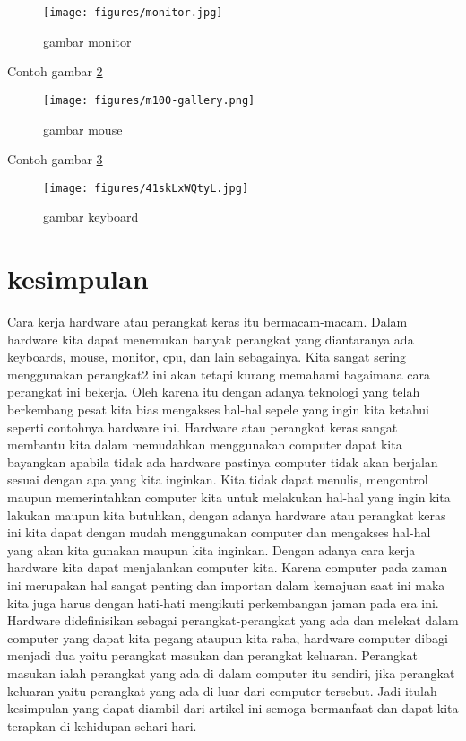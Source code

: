 \begin{figure}[ht]
\centerline{\texttt{[image: figures/monitor.jpg]}}
\caption{gambar monitor}
\label{monitor.jpg}
\end{figure}

Contoh gambar \ref{m100-gallery.png}

\begin{figure}[ht]
\centerline{\texttt{[image: figures/m100-gallery.png]}}
\caption{gambar mouse}
\label{m100-gallery.png}
\end{figure}

Contoh gambar \ref{41skLxWQtyL.jpg}

\begin{figure}[ht]
\centerline{\texttt{[image: figures/41skLxWQtyL.jpg]}}
\caption{gambar keyboard}
\label{41skLxWQtyL.jpg}
\end{figure}

\section {kesimpulan}
Cara kerja hardware atau perangkat keras itu bermacam-macam. Dalam hardware kita dapat menemukan banyak perangkat yang diantaranya ada keyboards, mouse, monitor, cpu, dan lain sebagainya. Kita sangat sering menggunakan perangkat2 ini akan tetapi kurang memahami bagaimana cara perangkat ini bekerja. Oleh karena itu dengan adanya teknologi yang telah berkembang pesat kita bias mengakses hal-hal sepele yang ingin kita ketahui seperti contohnya hardware ini. Hardware atau perangkat keras sangat membantu kita dalam memudahkan menggunakan computer dapat kita bayangkan apabila tidak ada hardware pastinya computer tidak akan berjalan sesuai dengan apa yang kita inginkan. Kita tidak dapat menulis, mengontrol maupun memerintahkan computer kita untuk melakukan hal-hal yang ingin kita lakukan maupun kita butuhkan, dengan adanya hardware atau perangkat keras ini kita dapat dengan mudah menggunakan computer dan mengakses hal-hal yang akan kita gunakan maupun kita inginkan. Dengan adanya cara kerja hardware kita dapat menjalankan computer kita. Karena computer pada zaman ini merupakan hal sangat penting dan importan dalam kemajuan saat ini maka kita juga harus dengan hati-hati mengikuti perkembangan jaman pada era ini. Hardware didefinisikan sebagai perangkat-perangkat yang ada dan melekat dalam computer yang dapat kita pegang ataupun kita raba, hardware computer dibagi menjadi dua yaitu perangkat masukan dan perangkat keluaran. Perangkat masukan ialah perangkat yang ada di dalam computer itu sendiri, jika perangkat keluaran yaitu perangkat yang ada di luar dari computer tersebut. Jadi itulah kesimpulan yang dapat diambil dari artikel ini semoga bermanfaat dan dapat kita terapkan di kehidupan sehari-hari.

